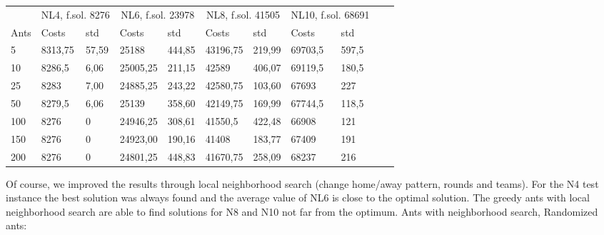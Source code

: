 \begin{minipage}[b]{1.0\textwidth}
    \begin{tabular}{ l | ll | ll | ll | ll | ll}
	\hline
	& \multicolumn{2}{c}{NL4, f.sol. 8276} & \multicolumn{2}{c}{NL6, f.sol. 23978}
	& \multicolumn{2}{c}{NL8, f.sol. 41505} & \multicolumn{2}{c}{NL10, f.sol. 68691} \\
	\cline{1-9}
	Ants & Costs & std & Costs & std & Costs & std & Costs & std \\
	\hline
	5   &  8313,75  & 57,59 &  25188    & 444,85 &  43196,75  & 219,99 &  69703,5  & 597,5 \\
	10  &  8286,5   & 6,06 &  25005,25  & 211,15 &  42589     & 406,07 &  69119,5  & 180,5 \\
	25  &  8283    & 7,00 &  24885,25   & 243,22 &  42580,75  & 103,60 &  67693 	& 227 \\
	50  &  8279,5  & 6,06 &  25139    & 358,60 &  42149,75   & 169,99 &  67744,5    & 118,5 \\
	100 &  8276    & 0 &  24946,25    & 308,61 &  41550,5    & 422,48 &  66908    & 121 \\
	150 &  8276    & 0 &  24923,00    & 190,16 &  41408      & 183,77 &  67409    &
	191 \\ 200 &  8276    & 0 &  24801,25    & 448,83 &  41670,75   & 258,09 &  68237    & 216 \\
	\hline
	\end{tabular}
\end{minipage}
\newline
Of course, we improved the results through local neighborhood search
(change home/away pattern, rounds and teams). For the N4 test instance the best
solution was always found and the average value of NL6 is close to the optimal solution. The greedy ants with local neighborhood search are able to find solutions for N8 and N10 not far from the optimum.
\newline
Ants with neighborhood search, Randomized ants:
\newline
